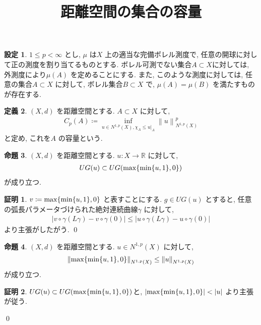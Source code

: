 \documentclass[10pt, fleqn, label-section=none]{bxjsarticle}
\title{距離空間の集合の容量}
\date{}
\author{}
\theoremstyle{definition}
\newtheorem{dfn}{定義}[section]
\newtheorem{prop}[dfn]{命題}
\newtheorem{setting}[dfn]{設定}
\newtheorem*{pf*}{証明}
\newcommand{\cbra}[1]{\mleft\{#1\mright\}}
\newcommand{\abs}[1]{\left|#1\right|}
\newcommand{\norm}[1]{\left\|#1\right\|}
\renewcommand{\;}{\, ; \,}
\begin{document}
\maketitle

\section{}

\begin{setting}$1 \leq p < \infty$ とし, $\mu $ は$X$ 上の適当な完備ボレル測度で, 任意の開球に対して正の測度を割り当てるものとする. ボレル可測でない集合$A \subset X$に対しては, 外測度により$\mu (A) $ を定めることにする. また, このような測度に対しては, 任意の集合$A \subset X$ に対して, ボレル集合$B \subset X$ で, $\mu(A) = \mu(B)$ を満たすものが存在する. 

\end{setting}



\begin{dfn}$(X, d)$ を距離空間とする. $A \subset X$ に対して, 
\begin{align*} C_p (A) \coloneqq    \inf_{u \in N^{1, p}(X),  \chi_A \leq u|_A } \norm{u}^p _{N^{1, p}(X)}    \end{align*}
と定め, これを$A$ の容量という. 
\end{dfn}

\begin{prop}$(X, d)$ を距離空間とする. $u: X \rightarrow \mathbb R$ に対して, 
\begin{align*} UG(u) \subset UG( \max \cbra{\min \cbra{u, 1}, 0}          )   \end{align*}
が成り立つ. 
\end{prop}
\begin{pf*}$v \coloneqq \max \cbra{\min \cbra{u, 1}, 0}    $ と表すことにする. $g \in UG(u)$ とすると, 任意の弧長パラメータづけられた絶対連続曲線$\gamma$ に対して, 
\begin{align*} \abs{v\circ \gamma(L\gamma) - v \circ \gamma(0)} \leq \abs{u\circ \gamma(L\gamma) - u \circ \gamma(0)} \end{align*}
より主張がしたがう. 
\qed
\end{pf*}

\begin{prop}$(X, d)$ を距離空間とする. $u \in N^{1, p}(X)$ に対して, 
\begin{align*}  \norm{ \max \cbra{\min \cbra{u, 1}, 0}      }_{N^{1, p}(X)} \leq \norm{u}_{N^{1, p}(X)}  \end{align*}
が成り立つ. 
\end{prop}
\begin{pf*}$UG(u) \subset UG( \max \cbra{\min \cbra{u, 1}, 0}        )  $と, $\abs{\max \cbra{\min \cbra{u, 1}, 0}     } < \abs{u}$ より主張が従う. 

\qed
\end{pf*}
\end{document}
